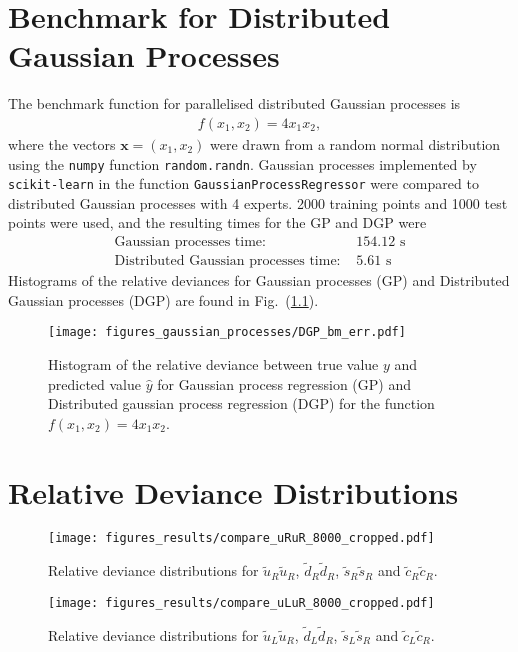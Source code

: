 \documentclass[twoside,english]{uiofysmaster}
\begin{document}
\begin{appendices}
\chapter{Benchmark for Distributed Gaussian Processes}

The benchmark function for parallelised distributed Gaussian processes is
\begin{align*}
f(x_1, x_2) =  4x_1x_2,
\end{align*}
where the vectors $\textbf{x} = (x_1, x_2)$ were drawn from a random normal distribution using the \verb|numpy| function \verb|random.randn|. Gaussian processes implemented by \verb|scikit-learn| in the function \verb|GaussianProcessRegressor| were compared to distributed Gaussian processes with 4 experts. 2000 training points and 1000 test points were used, and the resulting times for the GP and DGP were
\begin{align}
\text{Gaussian processes time: }& 154.12 \text{ s}\\
\text{Distributed Gaussian processes time: }& 5.61 \text{ s}
\end{align}
Histograms of the relative deviances for Gaussian processes (GP) and Distributed Gaussian processes (DGP) are found in Fig.\ (\ref{Fig:: gaussian process : DGP BM error histogram}).

\begin{figure}
\centering
\texttt{[image: figures\_gaussian\_processes/DGP\_bm\_err.pdf]}
\caption{Histogram of the relative deviance between true value $y$ and predicted value $\hat{y}$ for Gaussian process regression (GP) and Distributed gaussian process regression (DGP) for the function $f(x_1,x_2) = 4x_1 x_2$.}
\label{Fig:: gaussian process : DGP BM error histogram}
\end{figure}

\chapter{Relative Deviance Distributions}


\begin{figure}
\centering
\texttt{[image: figures\_results/compare\_uRuR\_8000\_cropped.pdf]}
\caption{Relative deviance distributions for $\tilde{u}_R \tilde{u}_R$, $\tilde{d}_R \tilde{d}_R$, $\tilde{s}_R \tilde{s}_R$ and $\tilde{c}_R \tilde{c}_R$.}
\end{figure}

\begin{figure}
\centering
\texttt{[image: figures\_results/compare\_uLuR\_8000\_cropped.pdf]}
\caption{Relative deviance distributions for $\tilde{u}_L \tilde{u}_R$, $\tilde{d}_L \tilde{d}_R$, $\tilde{s}_L \tilde{s}_R$ and $\tilde{c}_L \tilde{c}_R$.}
\end{figure}


\end{appendices}
\end{document}
